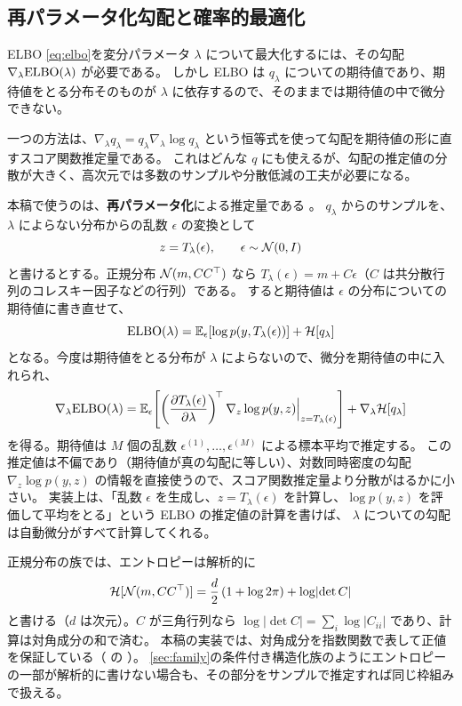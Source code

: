\subsection{再パラメータ化勾配と確率的最適化}\label{sec:inf-reparam}

ELBO \cref{eq:elbo}を変分パラメータ $\lambda$ について最大化するには、その勾配 $\nabla_\lambda \mathrm{ELBO}(\lambda)$ が必要である。
しかし ELBO は $q_\lambda$ についての期待値であり、期待値をとる分布そのものが $\lambda$ に依存するので、そのままでは期待値の中で微分できない。

一つの方法は、$\nabla_\lambda q_\lambda = q_\lambda \nabla_\lambda \log q_\lambda$ という恒等式を使って勾配を期待値の形に直すスコア関数推定量である。
これはどんな $q$ にも使えるが、勾配の推定値の分散が大きく、高次元では多数のサンプルや分散低減の工夫が必要になる。

本稿で使うのは、\textbf{再パラメータ化}による推定量である \parencite{kingma2014}。
$q_\lambda$ からのサンプルを、$\lambda$ によらない分布からの乱数 $\epsilon$ の変換として
\[
  z = T_\lambda(\epsilon), \qquad \epsilon \sim \mathcal{N}(0, I)
\]
と書けるとする。正規分布 $\mathcal{N}(m, C C^\top)$ なら $T_\lambda(\epsilon) = m + C\epsilon$（$C$ は共分散行列のコレスキー因子などの行列）である。
すると期待値は $\epsilon$ の分布についての期待値に書き直せて、
\[
  \mathrm{ELBO}(\lambda) = \mathbb{E}_{\epsilon}\!\left[\log p\!\left(y, T_\lambda(\epsilon)\right)\right] + \mathcal{H}[q_\lambda]
\]
となる。今度は期待値をとる分布が $\lambda$ によらないので、微分を期待値の中に入れられ、
\[
  \nabla_\lambda \mathrm{ELBO}(\lambda) = \mathbb{E}_{\epsilon}\!\left[ \left(\frac{\partial T_\lambda(\epsilon)}{\partial \lambda}\right)^{\!\top} \nabla_z \log p(y, z)\Big|_{z = T_\lambda(\epsilon)} \right] + \nabla_\lambda \mathcal{H}[q_\lambda]
\]
を得る。期待値は $M$ 個の乱数 $\epsilon^{(1)}, \dots, \epsilon^{(M)}$ による標本平均で推定する。
この推定値は不偏であり（期待値が真の勾配に等しい）、対数同時密度の勾配 $\nabla_z \log p(y, z)$ の情報を直接使うので、スコア関数推定量より分散がはるかに小さい。
実装上は、「乱数 $\epsilon$ を生成し、$z = T_\lambda(\epsilon)$ を計算し、$\log p(y, z)$ を評価して平均をとる」という ELBO の推定値の計算を書けば、
$\lambda$ についての勾配は自動微分がすべて計算してくれる。

正規分布の族では、エントロピーは解析的に
\[
  \mathcal{H}[\mathcal{N}(m, C C^\top)] = \frac{d}{2}\left(1 + \log 2\pi\right) + \log \lvert \det C \rvert
\]
と書ける（$d$ は次元）。$C$ が三角行列なら $\log \lvert\det C\rvert = \sum_i \log \lvert C_{ii} \rvert$ であり、計算は対角成分の和で済む。
本稿の実装では、対角成分を指数関数で表して正値を保証している（ の ）。
\cref{sec:family}の条件付き構造化族のようにエントロピーの一部が解析的に書けない場合も、その部分をサンプルで推定すれば同じ枠組みで扱える。


